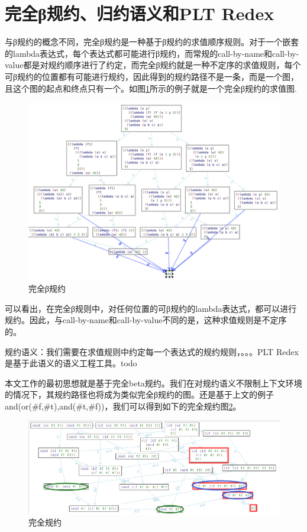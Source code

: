 \section{完全β规约、归约语义和PLT Redex}
与β规约的概念不同，完全β规约是一种基于β规约的求值顺序规则。对于一个嵌套的lambda表达式，每个表达式都可能进行β规约，而常规的call-by-name和call-by-value都是对规约顺序进行了约定，而完全β规约就是一种不定序的求值规则，每个可β规约的位置都有可能进行规约，因此得到的规约路径不是一条，而是一个图，且这个图的起点和终点只有一个。如图\ref{fig:beta}所示的例子就是一个完全β规约的求值图.

\begin{figure}[h]
	\centering
	\includegraphics[width=12cm]{images/chapter2/fullbeta.png}
	\caption{完全β规约}
	\label{fig:beta}
\end{figure}

可以看出，在完全β规则中，对任何位置的可β规约的lambda表达式，都可以进行规约。因此，与call-by-name和call-by-value不同的是，这种求值规则是不定序的。


规约语义：我们需要在求值规则中约定每一个表达式的规约规则，。。。PLT Redex是基于此语义的语义工程工具。todo

\pagebreak

本文工作的最初思想就是基于完全beta规约。我们在对规约语义不限制上下文环境的情况下，其规约路径也将成为类似完全β规约的图。还是基于上文的例子and(or(\#f,\#t),and(\#t,\#f))，我们可以得到如下的完全规约图\ref{fig:full_reduction}。

\begin{figure}[h]
	\centering
	\includegraphics[width=14cm]{images/chapter2/fullreduction.png}
	\caption{完全规约}
	\label{fig:full_reduction}
\end{figure}

